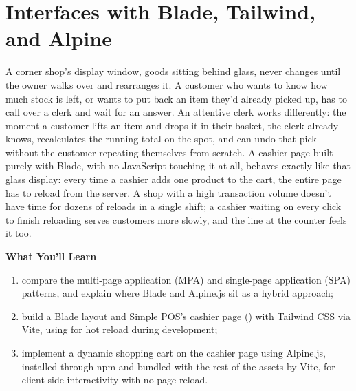 
\chapter{Interfaces with Blade, Tailwind, and Alpine}
\label{ch:blade-dan-tailwind}


A corner shop's display window, goods sitting behind glass, never changes
until the owner walks over and rearranges it. A customer who wants to know
how much stock is left, or wants to put back an item they'd already picked
up, has to call over a clerk and wait for an answer. An attentive clerk
works differently: the moment a customer lifts an item and drops it in
their basket, the clerk already knows, recalculates the running total on
the spot, and can undo that pick without the customer repeating themselves
from scratch. A cashier page built purely with Blade, with no JavaScript
touching it at all, behaves exactly like that glass display: every time a
cashier adds one product to the cart, the entire page has to reload from
the server. A shop with a high transaction volume doesn't have time for
dozens of reloads in a single shift; a cashier waiting on every click to
finish reloading serves customers more slowly, and the line at the counter
feels it too.

\textbf{What You'll Learn}

\begin{enumerate}
  \item compare the multi-page application (MPA) and single-page application (SPA) patterns, and explain where Blade and Alpine.js sit as a hybrid approach;
  \item build a Blade layout and Simple POS's cashier page () with Tailwind CSS via Vite, using  for hot reload during development;
  \item implement a dynamic shopping cart on the cashier page using Alpine.js, installed through npm and bundled with the rest of the assets by Vite, for client-side interactivity with no page reload.
\end{enumerate}

